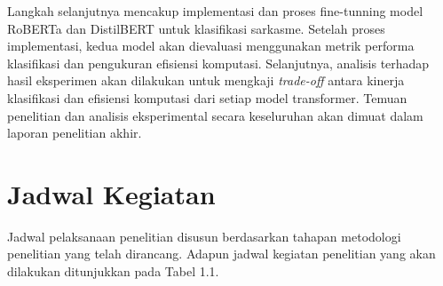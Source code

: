 Langkah selanjutnya mencakup implementasi dan proses fine-tunning model RoBERTa dan DistilBERT untuk klasifikasi sarkasme. Setelah proses implementasi, kedua model akan dievaluasi menggunakan metrik performa klasifikasi dan pengukuran efisiensi komputasi. Selanjutnya, analisis terhadap hasil eksperimen akan dilakukan untuk mengkaji \textit{trade-off} antara kinerja klasifikasi dan efisiensi komputasi dari setiap model transformer. Temuan penelitian dan analisis eksperimental secara keseluruhan akan dimuat dalam laporan penelitian akhir.


\section{Jadwal Kegiatan}

Jadwal pelaksanaan penelitian disusun berdasarkan tahapan metodologi penelitian yang telah dirancang. Adapun jadwal kegiatan penelitian yang akan dilakukan ditunjukkan pada Tabel 1.1.

